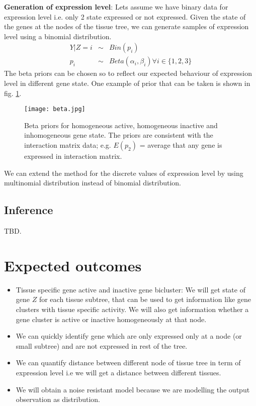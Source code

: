 \documentclass{article}
\begin{document}
\par \textbf{Generation of expression level}: Lets assume we have binary data for expression level i.e. only 2 state 
expressed or not expressed. Given the state of the genes at the nodes of the tissue tree,  we can generate samples of expression
level using a binomial distribution. 
\begin{eqnarray}
	Y|Z = i &\sim& Bin(p_i) \nonumber \\
	p_i &\sim&  Beta(\alpha_i,  \beta_i) \forall i \in \{1,2,3\}  
	\label{eqn:ydist}
\end{eqnarray}
The beta priors can be chosen so to reflect our expected behaviour of expression level in different gene state. One example of prior that can be taken
is shown in fig. \ref{fig:betaP}.
\begin{figure}[ht]
	\begin{center}
		\texttt{[image: beta.jpg]}
	\end{center}
	\caption{Beta priors for homogeneous active, homogeneous inactive and inhomogeneous gene state. The priors are consistent
	with the interaction matrix data; e.g. $E(p_2)$ = average that any gene is expressed in interaction matrix.}
	\label{fig:betaP}
\end{figure}


We can extend the method for the discrete values of expression level by using multinomial distribution instead of binomial distribution. 
\subsection{Inference}
TBD.
\section{Expected outcomes}
\begin{itemize}
	\item Tissue specific gene active and inactive gene bicluster: We will get state of gene $Z$ for each tissue subtree, that can be used to 
		get information like gene clusters with tissue specific activity. We will also get information whether a 
		gene cluster is active or inactive homogeneously at that node.
	\item We can  quickly identify gene which are only expressed only at a node (or small subtree) and are not expressed in rest of the
		tree. 
	\item We can quantify distance between different node of tissue tree in term of expression level i.e we will get a distance between
		different tissues. 
	\item We will obtain a noise resistant model because we are modelling the output observation as distribution.   
\end{itemize}

\end{document}

